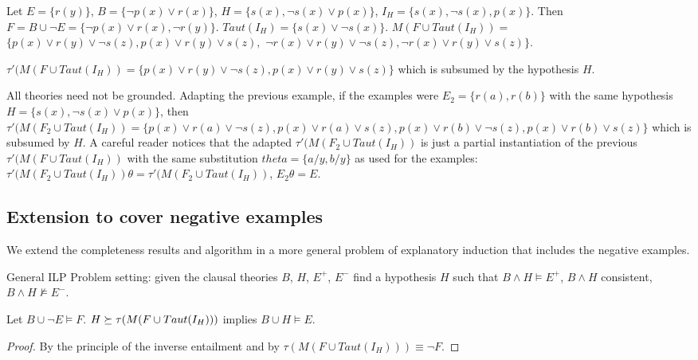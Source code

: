 \begin{exmp}
Let $E=\{r(y)\}$,
$B=\{\neg p(x) \vee r(x)\}$,
$H=\{s(x), \neg s(x) \vee p(x)\}$,
$I_H=\{s(x), \neg s(x), p(x)\}$.
Then $F=B \cup \neg E=\{\neg p(x) \vee r(x), \neg r(y) \}$.
$Taut(I_H)=\{s(x) \vee \neg s(x)\}$.
$M(F \cup Taut(I_H))=$
$\{p(x) \vee r(y) \vee \neg s(z), p(x) \vee r(y) \vee s(z),$
$\neg r(x) \vee r(y) \vee \neg s(z),\neg r(x) \vee r(y) \vee s(z) \}$.

$\tau'(M(F \cup Taut(I_H))=\{p(x) \vee r(y) \vee \neg s(z), p(x) \vee r(y) \vee s(z)\}$ which is subsumed by the hypothesis $H$.
\end{exmp}

\begin{exmp}
All theories need not be grounded. Adapting the previous example, if the examples were
$E_2=\{r(a), r(b)\}$ with the same hypothesis
$H=\{s(x), \neg s(x) \vee p(x)\}$, then
$\tau'(M(F_2 \cup Taut(I_H))=\{p(x) \vee r(a) \vee \neg s(z), p(x) \vee r(a) \vee s(z), p(x) \vee r(b) \vee \neg s(z), p(x) \vee r(b) \vee s(z) \}$ which is subsumed by $H$. A careful reader notices that the adapted $\tau'(M(F_2 \cup Taut(I_H))$ is just a partial instantiation of the previous
$\tau'(M(F \cup Taut(I_H))$ with the same substitution
$theta=\{a / y, b / y\}$ as used for the examples:
$\tau'(M(F_2 \cup Taut(I_H)) \theta=\tau'(M(F_2 \cup Taut(I_H))$,
$E_2 \theta = E$.
\end{exmp}

\subsection{Extension to cover negative examples}
We extend the completeness results and algorithm in a more general problem of explanatory induction that includes the negative examples.
\begin{defn}General ILP Problem setting: given the clausal theories $B$, $H$, $E^+$, $E^-$ find a hypothesis $H$ such that $B \wedge H \models E^{+}$, $B \wedge H$ consistent, $B \wedge H \not\models E^{-}$.
\end{defn}

\begin{lemma}\label{yamamoto2012inverseLemma2Converse}
Let $B \cup \neg E \models F$. $H \succeq \tau(M(F \cup Taut(I_H)))$ implies
$B \cup H \models E$.
\end{lemma}
\begin{proof}
By the principle of the inverse entailment and by $\tau(M(F \cup Taut(I_H))) \equiv \neg F$.
\end{proof}

